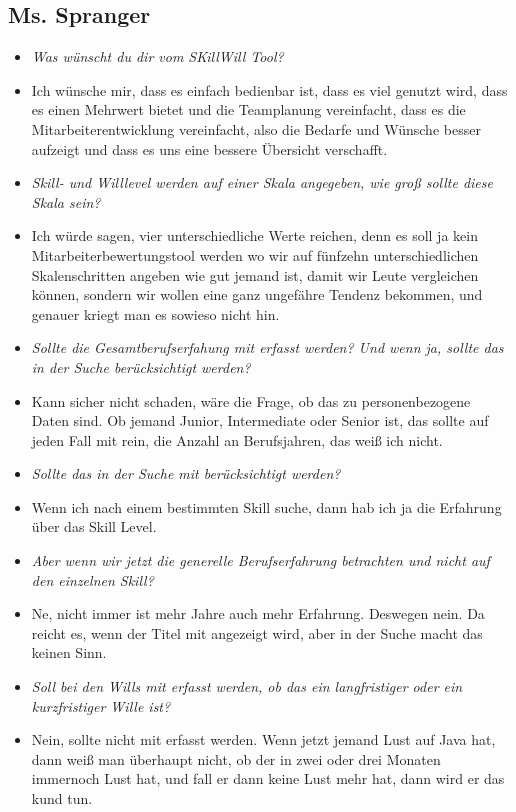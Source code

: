 \subsection{Ms. Spranger}
\begin{itemize}
\item[] \textit{Was wünscht du dir vom SKillWill Tool?}
\item[] Ich wünsche mir, dass es einfach bedienbar ist, dass es viel genutzt wird, dass es einen Mehrwert bietet und die Teamplanung vereinfacht, dass es die Mitarbeiterentwicklung vereinfacht, also die Bedarfe und Wünsche besser aufzeigt und dass es uns eine bessere Übersicht verschafft.

\item[] \textit{Skill- und Willlevel werden auf einer Skala angegeben, wie groß sollte diese Skala sein?}
\item[] Ich würde sagen, vier unterschiedliche Werte reichen, denn es soll ja kein Mitarbeiterbewertungstool werden wo wir auf fünfzehn unterschiedlichen Skalenschritten angeben wie gut jemand ist, damit wir Leute vergleichen können, sondern wir wollen eine ganz ungefähre Tendenz bekommen, und genauer kriegt man es sowieso nicht hin.

\item[] \textit{Sollte die Gesamtberufserfahung mit erfasst werden? Und wenn ja, sollte das in der Suche berücksichtigt werden?}
\item[] Kann sicher nicht schaden, wäre die Frage, ob das zu personenbezogene Daten sind. Ob jemand Junior, Intermediate oder Senior ist, das sollte auf jeden Fall mit rein, die Anzahl an Berufsjahren, das weiß ich nicht.

\item[] \textit{Sollte das in der Suche mit berücksichtigt werden?}
\item[] Wenn ich nach einem bestimmten Skill suche, dann hab ich ja die Erfahrung über das Skill Level.

\item[] \textit{Aber wenn wir jetzt die generelle Berufserfahrung betrachten und nicht auf den einzelnen Skill?}
\item[] Ne, nicht immer ist mehr Jahre auch mehr Erfahrung. Deswegen nein. Da reicht es, wenn der Titel mit angezeigt wird, aber in der Suche macht das keinen Sinn.

\item[] \textit{Soll bei den Wills mit erfasst werden, ob das ein langfristiger oder ein kurzfristiger Wille ist?}
\item[] Nein, sollte nicht mit erfasst werden. Wenn jetzt jemand Lust auf Java hat, dann weiß man überhaupt nicht, ob der in zwei oder drei Monaten immernoch Lust hat, und fall er dann keine Lust mehr hat, dann wird er das kund tun.


\end{itemize}
